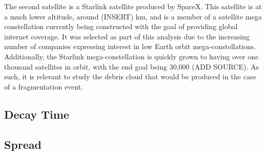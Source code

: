 \documentclass[a4paper, 12pt]{article}
\makeatletter
\renewcommand\section{\clearpage\newpage\@startsection {section}{1}{\z@}%
	{-3.5ex \@plus -1ex \@minus -.2ex}%
	{2.3ex \@plus.2ex}%
	{\normalfont\Large\bfseries}}
\makeatother
\begin{document}
The second satellite is a Starlink satellite produced by SpaceX. This satellite is at a much lower altitude, around (INSERT) km, and is a member of a satellite mega constellation currently being constructed with the goal of providing global internet coverage. It was selected as part of this analysis due to the increasing number of companies expressing interest in low Earth orbit mega-constellations. Additionally, the Starlink mega-constellation is quickly grown to having over one thousand satellites in orbit, with the end goal being 30,000 (ADD SOURCE). As such, it is relevant to study the debris cloud that would be produced in the case of a fragmentation event.



\subsection{Decay Time}

\subsection{Spread}






\printindex




\end{document}
